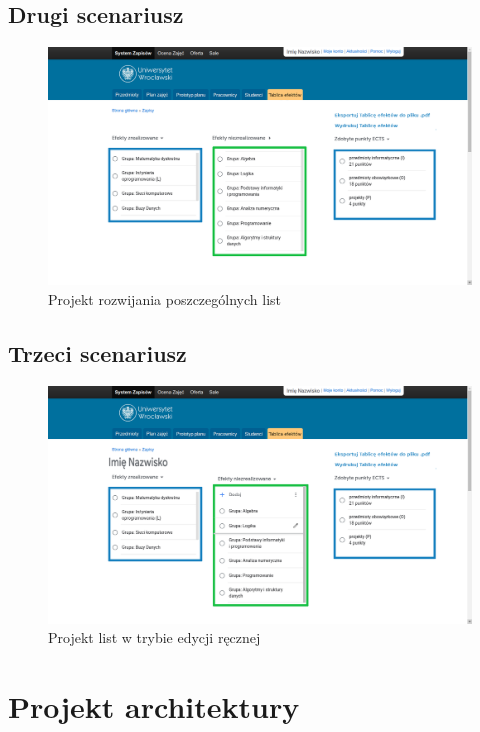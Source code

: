\documentclass{article}
\begin{document}
\subsection{Drugi scenariusz}
\begin{figure}[H]
	\begin{center}
		\caption{Projekt rozwijania poszczególnych list}
		\includegraphics[scale=0.23]{rozwin.png}
	\end{center}
\end{figure}

\subsection{Trzeci scenariusz}
\begin{figure}[H]
	\begin{center}
		\caption{Projekt list w trybie edycji ręcznej}
		\includegraphics[scale=0.23]{edycja.png}
	\end{center}
\end{figure}


\section{Projekt architektury}
\end{document}
